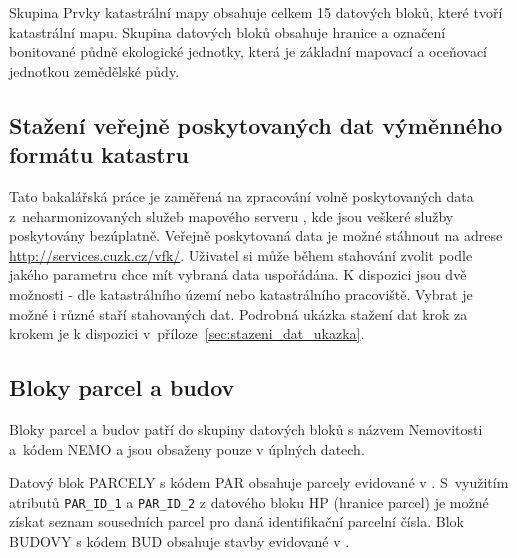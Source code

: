 Skupina Prvky katastrální mapy obsahuje celkem 15 datových bloků,
které tvoří katastrální mapu. Skupina datových bloků 
obsahuje hranice a označení bonitované půdně ekologické jednotky,
která je základní mapovací a oceňovací jednotkou zemědělské půdy.
\subsection{Stažení veřejně poskytovaných dat výměnného formátu katastru}
Tato bakalářská práce je zaměřená na zpracování volně
poskytovaných data z~neharmonizovaných služeb mapového serveru
, kde jsou veškeré služby poskytovány bezúplatně. Veřejně poskytovaná data  je
možné stáhnout na adrese \\
\href{http://services.cuzk.cz/vfk/}{http://services.cuzk.cz/vfk/}. Uživatel 
 si může během stahování zvolit podle jakého parametru chce mít vybraná data uspořádána.
 K dispozici jsou dvě možnosti - dle katastrálního území nebo katastrálního
 pracoviště. Vybrat je možné i různé staří stahovaných dat.  Podrobná
 ukázka stažení dat krok za krokem je k dispozici
 v~příloze~\ref{sec:stazeni_dat_ukazka}.
\subsection{Bloky parcel a budov}
\label{subsec:bloky_par_bud}
Bloky parcel a budov patří do skupiny datových bloků s názvem Nemovitosti
a~kódem NEMO a jsou obsaženy pouze v úplných datech.

Datový blok PARCELY s kódem PAR obsahuje parcely evidované v
. S~využitím atributů \verb|PAR_ID_1| a \verb|PAR_ID_2| z
datového bloku HP (hranice parcel) je možné získat seznam sousedních
parcel pro daná identifikační parcelní čísla. Blok BUDOVY s kódem BUD
obsahuje stavby evidované v .
 
